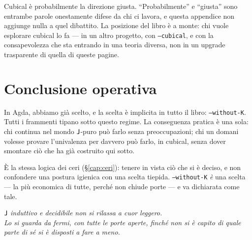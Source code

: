 \noindent Cubical \`e probabilmente la direzione giusta. ``Probabilmente'' e ``giusta'' sono entrambe parole onestamente difese da chi ci lavora, e questa appendice non aggiunge nulla a quel dibattito. La posizione del libro \`e a monte: chi vuole esplorare cubical lo fa --- in un altro progetto, con \texttt{--cubical}, e con la consapevolezza che sta entrando in una teoria diversa, non in un upgrade trasparente di quella di queste pagine.

\section*{Conclusione operativa}

In Agda, abbiamo gi\`a scelto, e la scelta \`e implicita in tutto il libro: \texttt{--without-K}. Tutti i frammenti tipano sotto questo regime. La conseguenza pratica \`e una sola: chi continua nel mondo $\mathsf{J}$-puro pu\`o farlo senza preoccupazioni; chi un domani volesse provare l'univalenza per davvero pu\`o farlo, in cubical, senza dover smontare ci\`o che ha gi\`a costruito qui sotto.

\medskip

\noindent \`E la stessa logica dei ceri (\S\ref{cap:ceri}): tenere in vista ci\`o che si \`e deciso, e non confondere una postura igienica con una scelta tiepida. \texttt{--without-K} \emph{\`e} una scelta --- la pi\`u economica di tutte, perch\'e non chiude porte --- e va dichiarata come tale.

\bigskip

\begin{center}
\itshape\color{halfgray}
$\mathsf{J}$ induttivo e decidibile non si rilassa a cuor leggero.\\
Lo si guarda da fermi, con tutte le porte aperte, finch\'e non si \`e capito di quale parte di s\'e si \`e disposti a fare a meno.
\end{center}
